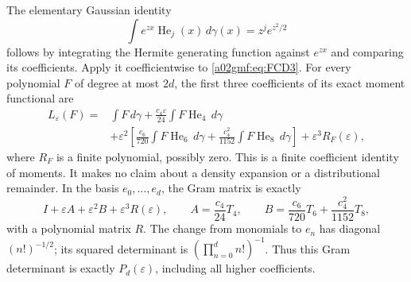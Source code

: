 \documentclass[11pt,a4paper]{article}
\begin{document}
The elementary Gaussian identity
\[
 \int e^{zx}\operatorname{He}_j(x)\,d\gamma(x)
       =z^j e^{z^2/2}
\]
follows by integrating the Hermite generating function against \(e^{zx}\)
and comparing its coefficients. Apply it coefficientwise to
\eqref{a02gmf:eq:FCD3}. For every polynomial \(F\) of degree at most \(2d\),
the first three coefficients of its exact moment functional are
\[
 \begin{split}
 L_\varepsilon(F)
 ={}&\int F\,d\gamma
       +\frac{c_4\varepsilon}{24}
                       \int F\operatorname{He}_4\,d\gamma\\
   &+\varepsilon^2\left[
        \frac{c_6}{720}\int F\operatorname{He}_6\,d\gamma
       +\frac{c_4^2}{1152}\int F\operatorname{He}_8\,d\gamma
                         \right]+\varepsilon^3 R_F(\varepsilon),
 \end{split}
\]
where \(R_F\) is a finite polynomial, possibly zero. This is a
finite coefficient identity of moments. It makes no claim about a
density expansion or a distributional remainder.
In the basis \(e_0,\ldots,e_d\), the Gram matrix is exactly
\[
 I+\varepsilon A+\varepsilon^2 B+\varepsilon^3 R(\varepsilon),
 \qquad
 A=\frac{c_4}{24}T_4,\qquad
 B=\frac{c_6}{720}T_6+\frac{c_4^2}{1152}T_8,
\]
with a polynomial matrix \(R\).
The change from monomials to \(e_n\) has diagonal
\((n!)^{-1/2}\); its squared determinant is
\((\prod_{n=0}^d n!)^{-1}\). Thus this Gram determinant is exactly
\(P_d(\varepsilon)\), including all higher coefficients.
\end{document}
